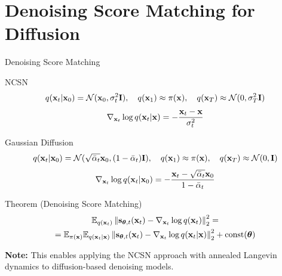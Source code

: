 \documentclass{beamer}
\begin{document}
\section{Denoising Score Matching for Diffusion}
\begin{frame}{Denoising Score Matching}
	\begin{block}{NCSN} 
		\vspace{-0.7cm} 
		\[
			q(\mathbf{x}_t | \mathbf{x}_0) = \mathcal{N}(\mathbf{x}_0, \sigma_t^2 \mathbf{I}), \quad q(\mathbf{x}_1) \approx \pi(\mathbf{x}), \quad q(\mathbf{x}_T) \approx \mathcal{N}(0, \sigma_T^2 \mathbf{I})
		\]
		\[
			\nabla_{\mathbf{x}_t} \log q(\mathbf{x}_t | \mathbf{x}) = - \frac{\mathbf{x}_t - \mathbf{x}}{\sigma_t^2}
		\]
		\vspace{-0.6cm} 
	\end{block}
    \eqpause
	\begin{block}{Gaussian Diffusion}
		\vspace{-0.7cm} 
		\[
			q(\mathbf{x}_t | \mathbf{x}_0) = \mathcal{N}(\sqrt{\bar{\alpha}_t} \mathbf{x}_0, (1 - \bar{\alpha}_t) \mathbf{I}), \quad q(\mathbf{x}_1) \approx \pi(\mathbf{x}), \quad q(\mathbf{x}_T) \approx \mathcal{N}(0, \mathbf{I})
		\]
		\[
			\nabla_{\mathbf{x}_t} \log q(\mathbf{x}_t | \mathbf{x}_0) = - \frac{\mathbf{x}_t - \sqrt{\bar{\alpha}_t} \mathbf{x}_0}{1 - \bar{\alpha}_t}
		\]
		\vspace{-0.6cm} 
	\end{block}
    \eqpause
	\begin{block}{Theorem (Denoising Score Matching)}
		\vspace{-0.7cm}
		\begin{multline*}
			\mathbb{E}_{q(\mathbf{x}_t)}\left\| \mathbf{s}_{\boldsymbol{\theta}, t}(\mathbf{x}_t) - \nabla_{\mathbf{x}_t} \log q(\mathbf{x}_t) \right\|_2^2 = \\
			= \mathbb{E}_{\pi(\mathbf{x})} \mathbb{E}_{q(\mathbf{x}_t | \mathbf{x})}\left\| \mathbf{s}_{\boldsymbol{\theta}, t}(\mathbf{x}_t) - \nabla_{\mathbf{x}_t} \log q(\mathbf{x}_t | \mathbf{x}) \right\|_2^2 + \text{const}(\boldsymbol{\theta})
		\end{multline*}
		\vspace{-0.5cm}
	\end{block}
    \eqpause
	\textbf{Note:} This enables applying the NCSN approach with annealed Langevin dynamics to diffusion-based denoising models.
\end{frame}
\end{document}
